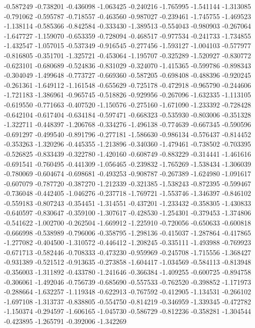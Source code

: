 -0.587249
-0.738201
-0.436098
-1.063425
-0.240216
-1.765995
-1.541144
-1.313085
-0.791062
-0.595787
-0.718557
-0.463560
-0.987027
-0.239461
-1.745755
-1.469523
-1.138114
-0.585366
-0.842584
-0.333430
-1.389513
-0.554043
-0.980903
-0.267064
-1.647727
-1.159070
-0.653359
-0.728094
-0.468517
-0.977534
-0.241733
-1.734855
-1.432547
-1.057015
-0.537349
-0.916545
-0.277456
-1.593127
-1.004103
-0.577977
-0.816805
-0.351701
-1.325721
-0.453064
-1.195707
-0.325289
-1.520927
-0.830772
-0.623101
-0.680689
-0.524836
-0.831029
-0.324070
-1.415365
-0.599786
-0.898343
-0.304049
-1.499648
-0.773727
-0.669360
-0.587205
-0.698408
-0.488396
-0.920245
-0.261361
-1.649112
-1.161548
-0.655629
-0.725178
-0.472918
-0.965790
-0.244606
-1.721183
-1.386961
-0.965745
-0.518826
-0.929956
-0.267096
-1.632335
-1.113105
-0.619550
-0.771663
-0.407520
-1.150576
-0.275160
-1.671090
-1.233392
-0.728428
-0.642104
-0.617404
-0.634184
-0.597471
-0.668323
-0.535930
-0.803006
-0.351328
-1.322711
-0.448397
-1.206768
-0.334276
-1.496138
-0.774639
-0.667345
-0.590596
-0.691297
-0.499540
-0.891796
-0.277181
-1.586630
-0.986134
-0.576437
-0.814452
-0.353263
-1.320296
-0.445355
-1.213896
-0.340360
-1.479461
-0.738502
-0.703395
-0.526825
-0.833439
-0.322780
-1.420160
-0.608749
-0.883229
-0.314441
-1.461616
-0.691541
-0.760495
-0.441309
-1.056465
-0.239832
-1.765269
-1.538434
-1.306039
-0.780069
-0.604674
-0.698681
-0.493253
-0.908787
-0.267389
-1.624980
-1.091617
-0.607079
-0.787720
-0.387270
-1.212339
-0.321385
-1.538243
-0.872395
-0.599467
-0.736048
-0.442405
-1.046276
-0.237718
-1.769721
-1.553746
-1.346397
-0.846102
-0.559183
-0.807243
-0.354451
-1.314551
-0.437201
-1.233432
-0.358305
-1.430833
-0.640597
-0.830647
-0.359100
-1.307617
-0.428530
-1.254301
-0.379453
-1.374806
-0.541622
-1.002700
-0.262504
-1.669912
-1.225910
-0.720056
-0.650633
-0.600818
-0.666998
-0.538989
-0.796006
-0.358795
-1.298136
-0.415037
-1.287864
-0.417865
-1.277082
-0.404500
-1.310572
-0.446412
-1.208245
-0.335111
-1.493988
-0.769923
-0.671713
-0.582446
-0.708333
-0.473230
-0.959969
-0.245708
-1.715556
-1.368427
-0.931389
-0.521512
-0.913635
-0.273858
-1.604417
-1.034569
-0.584113
-0.813948
-0.356003
-1.311892
-0.433780
-1.241646
-0.366384
-1.409255
-0.600725
-0.894758
-0.306061
-1.492046
-0.756739
-0.685690
-0.557533
-0.762520
-0.398852
-1.171973
-0.288664
-1.632257
-1.119348
-0.622913
-0.767592
-0.412905
-1.134531
-0.266102
-1.697108
-1.313737
-0.838805
-0.554750
-0.814219
-0.346959
-1.339345
-0.472782
-1.150374
-0.294597
-1.606165
-1.045730
-0.586729
-0.812236
-0.358281
-1.304544
-0.423895
-1.265791
-0.392006
-1.342269
